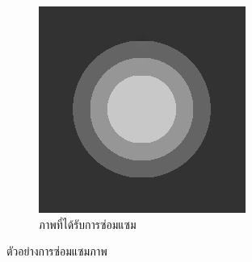 \begin{figure}[H]
\begin{subfigure}{0.3\linewidth}
	\end{subfigure}
	\begin{subfigure}{0.3\linewidth}
		\centering
		\includegraphics[width=0.8\linewidth]{image/grayscale_inpaint/result_splitbergman.png}
        \caption{ภาพที่ได้รับการซ่อมแซม}
        \label{figure:inpaint-explain:inpainted}
	\end{subfigure}
	\caption{ตัวอย่างการซ่อมแซมภาพ}
	\label{figure:inpaint-explain}
\end{figure}